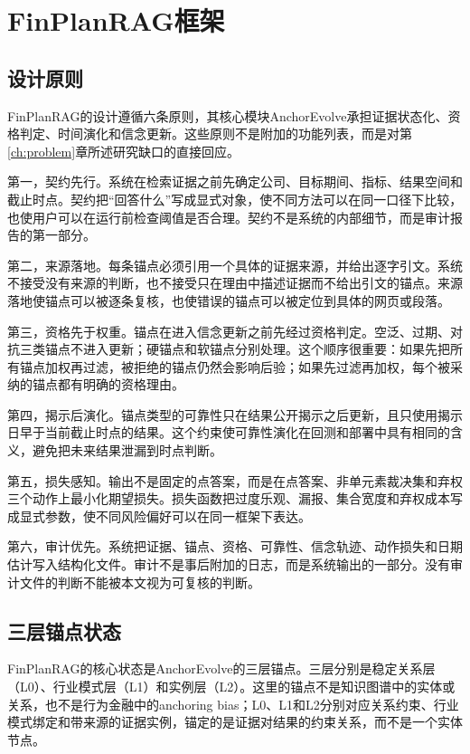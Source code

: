 \chapter{FinPlanRAG框架}
\label{ch:framework}

\section{设计原则}

FinPlanRAG的设计遵循六条原则，其核心模块AnchorEvolve承担证据状态化、资格判定、时间演化和信念更新。这些原则不是附加的功能列表，而是对第\ref{ch:problem}章所述研究缺口的直接回应。

第一，契约先行。系统在检索证据之前先确定公司、目标期间、指标、结果空间和截止时点。契约把“回答什么”写成显式对象，使不同方法可以在同一口径下比较，也使用户可以在运行前检查阈值是否合理。契约不是系统的内部细节，而是审计报告的第一部分。

第二，来源落地。每条锚点必须引用一个具体的证据来源，并给出逐字引文。系统不接受没有来源的判断，也不接受只在理由中描述证据而不给出引文的锚点。来源落地使锚点可以被逐条复核，也使错误的锚点可以被定位到具体的网页或段落。

第三，资格先于权重。锚点在进入信念更新之前先经过资格判定。空泛、过期、对抗三类锚点不进入更新；硬锚点和软锚点分别处理。这个顺序很重要：如果先把所有锚点加权再过滤，被拒绝的锚点仍然会影响后验；如果先过滤再加权，每个被采纳的锚点都有明确的资格理由。

第四，揭示后演化。锚点类型的可靠性只在结果公开揭示之后更新，且只使用揭示日早于当前截止时点的结果。这个约束使可靠性演化在回测和部署中具有相同的含义，避免把未来结果泄漏到时点判断。

第五，损失感知。输出不是固定的点答案，而是在点答案、非单元素裁决集和弃权三个动作上最小化期望损失。损失函数把过度乐观、漏报、集合宽度和弃权成本写成显式参数，使不同风险偏好可以在同一框架下表达。

第六，审计优先。系统把证据、锚点、资格、可靠性、信念轨迹、动作损失和日期估计写入结构化文件。审计不是事后附加的日志，而是系统输出的一部分。没有审计文件的判断不能被本文视为可复核的判断。

\section{三层锚点状态}

FinPlanRAG的核心状态是AnchorEvolve的三层锚点。三层分别是稳定关系层（L0）、行业模式层（L1）和实例层（L2）。这里的锚点不是知识图谱中的实体或关系，也不是行为金融中的anchoring bias；L0、L1和L2分别对应关系约束、行业模式绑定和带来源的证据实例，锚定的是证据对结果的约束关系，而不是一个实体节点。

